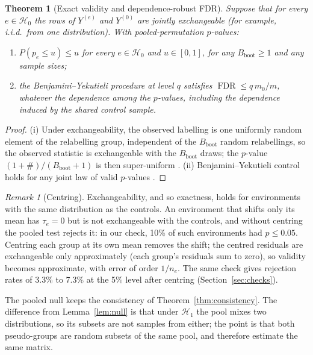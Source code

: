 \documentclass[11pt]{article}
\newtheorem{theorem}{Theorem}
\theoremstyle{remark}
\newtheorem{remark}{Remark}
\newcommand{\op}{\operatorname}
\newcommand{\Hone}{\mathcal{H}_1}
\newcommand{\Hzero}{\mathcal{H}_0}
\newcommand{\Bb}{B_{\mathrm{boot}}}
\begin{document}
\setcounter{theorem}{1}
\begin{theorem}[Exact validity and dependence-robust FDR]
\label{thm:validity}
Suppose that for every $e\in\Hzero$ the rows of $Y^{(e)}$ and $Y^{(0)}$ are jointly exchangeable (for example, i.i.d.\ from one distribution). With pooled-permutation $p$-values:
\begin{enumerate}
  \item[(i)] $P(p_e\le u)\le u$ for every $e\in\Hzero$ and $u\in[0,1]$, for any $\Bb\ge1$ and any sample sizes;
  \item[(ii)] the Benjamini--Yekutieli procedure at level $q$ satisfies $\op{FDR}\le q\,m_0/m$, whatever the dependence among the $p$-values, including the dependence induced by the shared control sample.
\end{enumerate}
\end{theorem}

\begin{proof}
(i) Under exchangeability, the observed labelling is one uniformly random element of the relabelling group, independent of the $\Bb$ random relabellings, so the observed statistic is exchangeable with the $\Bb$ draws; the $p$-value $(1+\#)/(\Bb+1)$ is then super-uniform \citep{phipson2010permutation,hemerik2018exact}. (ii) Benjamini--Yekutieli control holds for any joint law of valid $p$-values \citep[Theorem 1.3]{benjamini2001control}.
\end{proof}

\begin{remark}[Centring]
Exchangeability, and so exactness, holds for environments with the same distribution as the controls. An environment that shifts only its mean has $\tau_e=0$ but is not exchangeable with the controls, and without centring the pooled test rejects it: in our check, 10\% of such environments had $p\le0.05$. Centring each group at its own mean removes the shift; the centred residuals are exchangeable only approximately (each group's residuals sum to zero), so validity becomes approximate, with error of order $1/n_e$. The same check gives rejection rates of 3.3\% to 7.3\% at the 5\% level after centring (Section~\ref{sec:checks}).
\end{remark}

The pooled null keeps the consistency of Theorem~\ref{thm:consistency}. The difference from Lemma~\ref{lem:null} is that under $\Hone$ the pool mixes two distributions, so its subsets are not samples from either; the point is that both pseudo-groups are random subsets of the same pool, and therefore estimate the same matrix.
\end{document}
